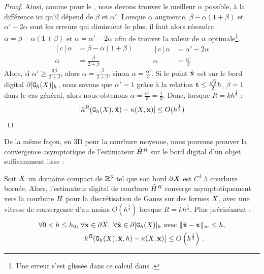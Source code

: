 \begin{proof}
%
Ainsi, comme pour le , nous devons trouver
le meilleur $\alpha$ possible, à la différence ici qu'il dépend de $\beta$ et
$\alpha'$.
%
Lorsque $\alpha$ augmente, $\beta-\alpha(1+\beta)$ et $\alpha'-2\alpha$ sont les
erreurs qui diminuent le plus, il faut alors résoudre $\alpha =
\beta-\alpha(1+\beta)$ et $\alpha = \alpha'-2\alpha$ afin de trouver la valeur
de $\alpha$ optimale\footnote{Une erreur s'est glissée dans ce calcul dans
\cite{DGCI2013}.}.
%
\begin{equation}
\begin{aligned}[c]
  \alpha &= \beta-\alpha(1+\beta)\\
  \alpha &= \frac{\beta}{2+\beta}
\end{aligned}
\qquad
\begin{aligned}[c]
  \alpha &= \alpha' - 2\alpha\\
  \alpha &= \frac{\alpha'}{3}
\end{aligned}
\end{equation}
%
Alors, si $\alpha' \ge \frac{3 \beta}{2 + \beta}$, alors $\alpha = \frac{\beta}{2 +
\beta}$, sinon $\alpha = \frac{\alpha'}{3}$.
%
Si le point $\hat{\mathbf{x}}$ est sur le bord digital $\partial \lbrack \mathtt{G}_{h}(X) \rbrack_{h}$, nous savons
que $\alpha'=1$ grâce à la relation $\mathbf{t} \le \frac{\sqrt{2}}{2}h$, $\beta = 1$
dans le cas général, alors nous obtenons $\alpha = \frac{\alpha'}{3} =
\frac{1}{3}$. Donc, lorsque $R = kh^{\frac{1}{3}}$ :
%
\begin{equation}
  | \hat{\kappa}^{R}(\mathtt{G}_{h}(X),\hat{\mathbf{x}}) - \kappa(X,\mathbf{x}) | \le O(h^{\frac{1}{3}})
\end{equation}
%
\end{proof}
%
De la même façon, en 3D pour la courbure moyenne, nous pouvons prouver la
convergence asymptotique de l'estimateur $\hat{H}^{R}$ sur le bord digital
d'un objet suffisamment lisse :
%
\begin{theorem} \label{thm:multigrid-convergence-curv-mean}
%
Soit $X$ un domaine compact de $\mathbb{R}^3$ tel que son bord $\partial X$ est $C^3$ à
courbure bornée. Alors, l'estimateur digital de courbure $\hat{H}^{R}$ converge
asymptotiquement vers la courbure $H$ pour la discrétisation de Gauss sur
des formes $X$, avec une vitesse de convergence d'au moins
$O(h^\frac{1}{3})$ lorsque $R = kh^\frac{1}{3}$. Plus précisément :
%
\begin{align}
  \forall 0 < h \le h_0,\,\, & \forall \mathbf{x} \in \partial X,\,\,
  \forall \hat{\mathbf{x}} \in \partial \lbrack \mathtt{G}_{h}(X) \rbrack_{h} \text{~avec~} \| \hat{\mathbf{x}} -\mathbf{x}\|_\infty \le h, \nonumber \\
  & \left| \hat{\kappa}^{R}(\mathtt{G}_{h}(X), \hat{\mathbf{x}}, h) - \kappa(X, \mathbf{x}) \right| \le O\left(h^{\frac{1}{3}}\right)\,.
\end{align}
%
\end{theorem}
